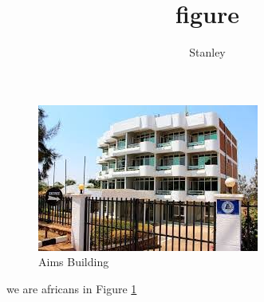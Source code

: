 \documentclass[10pt,a4paper]{article}
\author{Stanley}
\title{figure}
\begin{document}
\begin{figure}[h!]
\centering
\includegraphics[scale=0.5]{AIMSRwanda.jpg}
\caption{Aims Building}
\label{Fig 1}
\end{figure}

 we are africans in Figure \ref{Fig 1}
\end{document}
